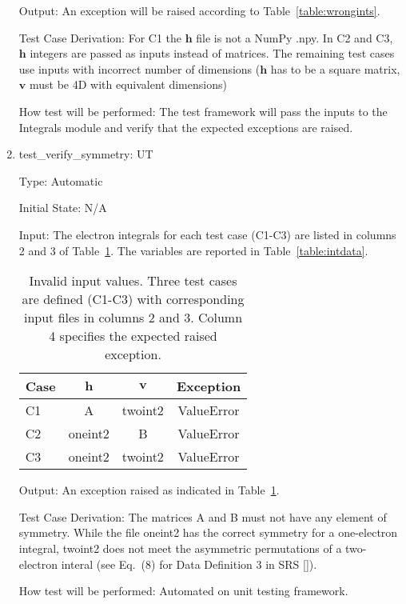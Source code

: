 \documentclass[12pt, titlepage]{article}
\newcounter{utnum} %
\begin{document}
\begin{enumerate}
	Output: An exception will be raised according to 
	Table~\ref{table:wrongints}.
	
	Test Case Derivation: For C1 the $\mathbf{h}$ file is not a NumPy .npy. In 
	C2 and C3, $\mathbf{h}$ integers are passed as inputs instead of matrices. 
	The remaining test cases use inputs with incorrect number of dimensions 
	($\mathbf{h}$ has to be a square matrix, $\mathbf{v}$ must be 4D with 
	equivalent dimensions)
	
	How test will be performed: The test framework will pass the inputs to 
	the Integrals module and verify that the expected exceptions are raised.
	
	\item{test\_verify\_symmetry:  UT\theutnum 
		\label{UT5}}
	
	Type: Automatic
	
	Initial State: N/A
	
	Input: The electron integrals for each test case (C1-C3) are listed in 
	columns 2 and 3 of Table~\ref{table:symmints}. The variables 
	are reported in Table~\ref{table:intdata}.
	\begin{table}[h!]
		\centering
		\begin{tabular}{lccc}
			Case & $\mathbf{h}$ & $\mathbf{v}$ & Exception  \\ \toprule
			C1   &      A       &   twoint2    & ValueError \\
			C2   &   oneint2    &      B       & ValueError \\
			C3   &   oneint2    &   twoint2    & ValueError \\ \bottomrule
		\end{tabular}
		\caption{Invalid input values. Three test cases are defined (C1-C3) 
			with corresponding input files in columns 2 and 3. Column 4 
			specifies the expected raised exception.}
		\label{table:symmints}
	\end{table}	
	
	Output: An exception raised as indicated in Table~\ref{table:symmints}.
	
	Test Case Derivation: The matrices A and B must not have any element of 
	symmetry. While the file oneint2 has the correct symmetry for a 
	one-electron integral, twoint2 does not meet the asymmetric permutations of 
	a two-electron interal (see Eq.~(8) for Data Definition 3 in SRS 
	[\cite{SRS2020}]).
	
	How test will be performed: Automated on unit testing framework.
	
\end{enumerate}
\end{document}
